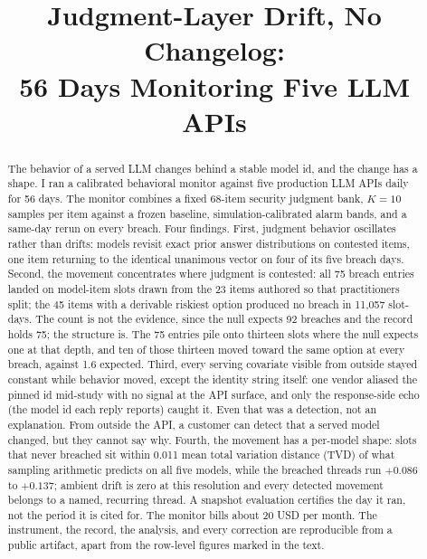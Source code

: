 \documentclass[conference]{IEEEtran}
\begin{document}
\title{Judgment-Layer Drift, No Changelog:\\
56 Days Monitoring Five LLM APIs}

\author{
}

\maketitle

\begin{abstract}
The behavior of a served LLM changes behind a stable model id, and the
change has a shape. I ran a calibrated behavioral monitor against five
production LLM APIs daily for 56 days. The monitor combines a fixed
68-item security judgment bank, $K{=}10$ samples per item against a
frozen baseline, simulation-calibrated alarm bands, and a same-day
rerun on every breach. Four findings. First, judgment behavior
oscillates rather than drifts: models revisit exact prior answer
distributions on contested items, one item returning to the identical
unanimous vector on four of its five breach days. Second, the movement
concentrates where judgment is contested: all 75 breach entries landed
on model-item slots drawn from the 23 items authored so that
practitioners split; the 45 items with a derivable riskiest option
produced no breach in 11,057 slot-days. The count is not the evidence,
since the null expects 92 breaches and the record holds 75; the
structure is. The 75 entries pile onto thirteen slots where the null
expects one at that depth, and ten of those thirteen moved toward the
same option at every breach, against 1.6 expected. Third, every
serving covariate visible from outside stayed constant while behavior
moved, except the identity string itself: one vendor aliased the
pinned id mid-study with no signal at the API surface, and only the
response-side echo (the model id each reply reports) caught it. Even
that was a detection, not an explanation. From outside the API, a
customer can detect that a served model changed, but they cannot say
why. Fourth, the movement has a per-model shape: slots that never
breached sit within 0.011 mean total variation distance (TVD) of what
sampling arithmetic predicts on all five models, while the breached
threads run $+0.086$ to $+0.137$; ambient drift is zero at this
resolution and every detected movement belongs to a named, recurring
thread. A snapshot evaluation certifies the day it ran, not the period
it is cited for. The monitor bills about 20 USD per month. The
instrument, the record, the analysis, and every correction are
reproducible from a public artifact, apart from the row-level figures
marked in the text.
\end{abstract}
\end{document}
